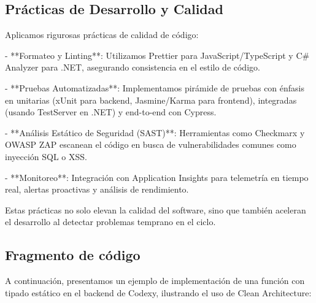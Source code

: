 \subsection{Prácticas de Desarrollo y Calidad}

Aplicamos rigurosas prácticas de calidad de código:

- **Formateo y Linting**: Utilizamos Prettier para JavaScript/TypeScript y C\# Analyzer para .NET, asegurando consistencia en el estilo de código.

- **Pruebas Automatizadas**: Implementamos pirámide de pruebas con énfasis en unitarias (xUnit para backend, Jasmine/Karma para frontend), integradas (usando TestServer en .NET) y end-to-end con Cypress.

- **Análisis Estático de Seguridad (SAST)**: Herramientas como Checkmarx y OWASP ZAP escanean el código en busca de vulnerabilidades comunes como inyección SQL o XSS.

- **Monitoreo**: Integración con Application Insights para telemetría en tiempo real, alertas proactivas y análisis de rendimiento.

Estas prácticas no solo elevan la calidad del software, sino que también aceleran el desarrollo al detectar problemas temprano en el ciclo.

\subsection{Fragmento de código}

A continuación, presentamos un ejemplo de implementación de una función con tipado estático en el backend de Codexy, ilustrando el uso de Clean Architecture:

